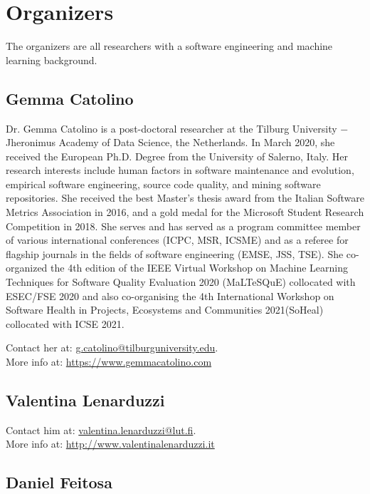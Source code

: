 
\section{Organizers}

The organizers are all researchers with a software engineering and machine learning background.

\label{sec:organizers}
\subsection{Gemma Catolino}
Dr. Gemma Catolino is a post-doctoral researcher at the Tilburg University $-$ Jheronimus Academy of Data Science, the Netherlands.
In March 2020, she received the European Ph.D. Degree from the University of Salerno, Italy. Her research interests include human factors in software maintenance and evolution, empirical software engineering, source code quality, and mining software repositories.
She received the best Master's thesis award from the Italian Software Metrics Association in 2016, and a gold medal for the Microsoft Student Research Competition in 2018. She serves and has served as a program committee member of various international conferences (ICPC, MSR, ICSME) and as a referee for flagship journals in the fields of software engineering (EMSE, JSS, TSE). She co-organized the 4th edition of the IEEE Virtual Workshop on Machine Learning Techniques for Software Quality Evaluation 2020 (MaLTeSQuE) collocated with ESEC/FSE 2020 and also co-organising the 4th International Workshop on Software Health in Projects, Ecosystems and Communities 2021(SoHeal) collocated with ICSE 2021.

\medskip
\noindent Contact her at: \href{mailto:g.catolino@tilburguniversity.edul}{g.catolino@tilburguniversity.edu}.\\
More info at: \url{https://www.gemmacatolino.com}


\subsection{Valentina Lenarduzzi}


\medskip
\noindent 
Contact him at: \href{mailto:valentina.lenarduzzi@lut.fi}{valentina.lenarduzzi@lut.fi}.\\
More info at: \url{http://www.valentinalenarduzzi.it}

\subsection{Daniel Feitosa}


